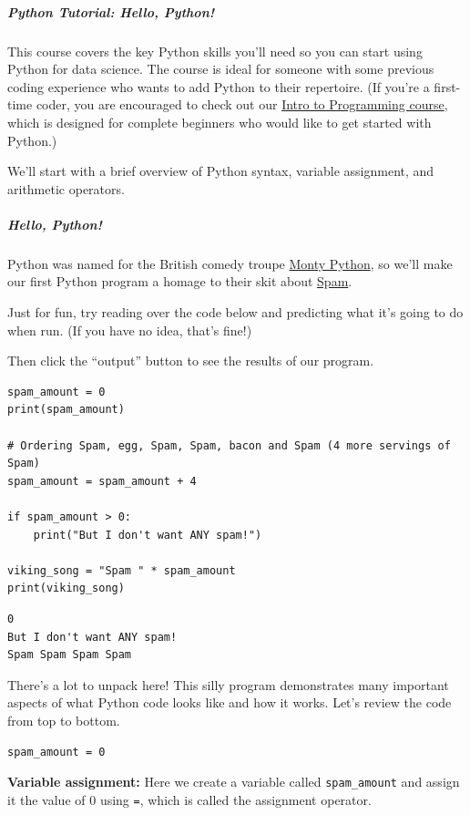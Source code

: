\subparagraph{Python Tutorial: Hello, Python!}

This course covers the key Python skills you'll need so you can start using Python for data science. The course is ideal for someone with some previous coding experience who wants to add Python to their repertoire. (If you're a first-time coder, you are encouraged to check out our \href{https://www.kaggle.com/learn/intro-to-programming}{Intro to Programming course}, which is designed for complete beginners who would like to get started with Python.)

We'll start with a brief overview of Python syntax, variable assignment, and arithmetic operators.

\subparagraph{Hello, Python!}

Python was named for the British comedy troupe \href{https://en.wikipedia.org/wiki/Monty\_Python}{Monty Python}, so we'll make our first Python program a homage to their skit about \href{https://bit.ly/3MwwjSs}{Spam}.

Just for fun, try reading over the code below and predicting what it's going to do when run. (If you have no idea, that's fine!)

Then click the ``output'' button to see the results of our program.

\begin{verbatim}
spam_amount = 0
print(spam_amount)

# Ordering Spam, egg, Spam, Spam, bacon and Spam (4 more servings of Spam)
spam_amount = spam_amount + 4

if spam_amount > 0:
    print("But I don't want ANY spam!")

viking_song = "Spam " * spam_amount
print(viking_song)
\end{verbatim}

\begin{verbatim}
0
But I don't want ANY spam!
Spam Spam Spam Spam
\end{verbatim}

There's a lot to unpack here! This silly program demonstrates many important aspects of what Python code looks like and how it works. Let's review the code from top to bottom.

\begin{verbatim}
spam_amount = 0
\end{verbatim}

\textbf{Variable assignment:} Here we create a variable called \texttt{spam\_amount} and assign it the value of 0 using \texttt{=}, which is called the assignment operator.

